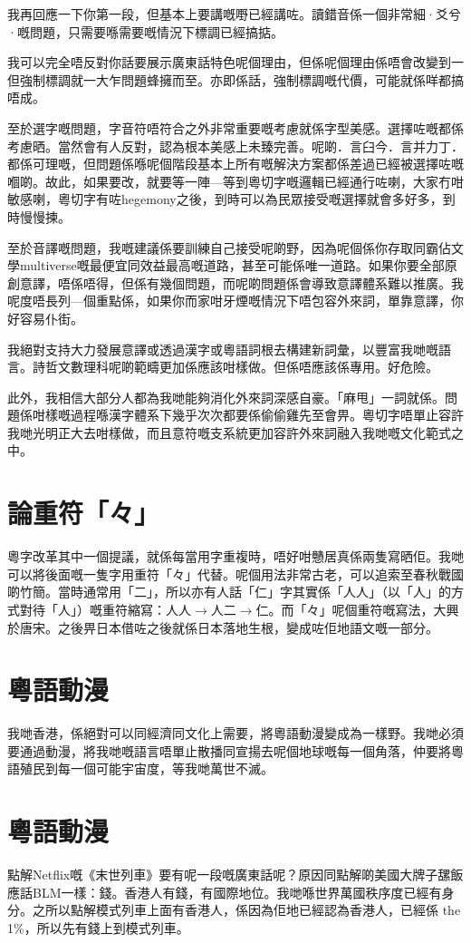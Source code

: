 \documentclass[a5paper, 10pt, openany]{book} %
\begin{document}
我再回應一下你第一段，但基本上要講嘅嘢已經講咗。讀錯音係一個非常細·爻兮·嘅問題，只需要喺需要嘅情況下標調已經搞掂。

我可以完全唔反對你話要展示廣東話特色呢個理由，但係呢個理由係唔會改變到一但強制標調就一大乍問題蜂擁而至。亦即係話，強制標調嘅代價，可能就係咩都搞唔成。

至於選字嘅問題，字音符唔符合之外非常重要嘅考慮就係字型美感。選擇咗嘅都係考慮晒。當然會有人反對，認為根本美感上未臻完善。呢啲．言臼今．言并力丁．都係可理嘅，但問題係喺呢個階段基本上所有嘅解決方案都係差過已經被選擇咗嘅嗰啲。故此，如果要改，就要等一陣—等到粵切字嘅邏輯已經通行咗喇，大家冇咁敏感喇，粵切字有咗hegemony之後，到時可以為民眾接受嘅選擇就會多好多，到時慢慢揀。

至於音譯嘅問題，我嘅建議係要訓練自己接受呢啲野，因為呢個係你存取同霸佔文學multiverse嘅最便宜同效益最高嘅道路，甚至可能係唯一道路。如果你要全部原創意譯，唔係唔得，但係有幾個問題，而呢啲問題係會導致意譯體系難以推廣。我呢度唔長列—個重點係，如果你而家咁牙煙嘅情況下唔包容外來詞，單靠意譯，你好容易仆街。

我絕對支持大力發展意譯或透過漢字或粵語詞根去構建新詞彙，以豐富我哋嘅語言。詩哲文數理科呢啲範疇更加係應該咁樣做。但係唔應該係專用。好危險。

此外，我相信大部分人都為我哋能夠消化外來詞深感自豪。「麻甩」一詞就係。問題係咁樣嘅過程喺漢字體系下幾乎次次都要係偷偷雞先至會畀。粵切字唔單止容許我哋光明正大去咁樣做，而且意符嘅支系統更加容許外來詞融入我哋嘅文化範式之中。

\chapter{論重符「々」}
粵字改革其中一個提議，就係每當用字重複時，唔好咁戇居真係兩隻寫晒佢。我哋可以將後面嘅一隻字用重符「々」代替。呢個用法非常古老，可以追索至春秋戰國啲竹簡。當時通常用「二」，所以亦有人話「仁」字其實係「人人」（以「人」的方式對待「人」）嘅重符縮寫：人人$\rightarrow$人二$\rightarrow$仁。而「々」呢個重符嘅寫法，大興於唐宋。之後畀日本借咗之後就係日本落地生根，變成咗佢地語文嘅一部分。


\chapter{粵語動漫}
我哋香港，係絕對可以同經濟同文化上需要，將粵語動漫變成為一樣野。我哋必須要通過動漫，將我哋嘅語言唔單止散播同宣揚去呢個地球嘅每一個角落，仲要將粵語殖民到每一個可能宇宙度，等我哋萬世不滅。


\chapter{粵語動漫}
點解Netflix嘅《末世列車》要有呢一段嘅廣東話呢？原因同點解啲美國大牌子𦧲飯應話BLM一樣：錢。香港人有錢，有國際地位。我哋喺世界萬國秩序度已經有身分。之所以點解模式列車上面有香港人，係因為佢地已經認為香港人，已經係 the 1\%，所以先有錢上到模式列車。
\end{document}
